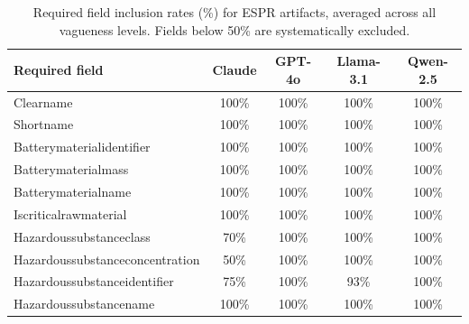 \begin{table}[t]
  \centering
  \caption{Required field inclusion rates (\%) for ESPR artifacts, averaged across all vagueness levels. Fields below 50\% are systematically excluded.}
  \label{tab:espr_field_inclusion}
  \begin{tabular}{lcccc}
    \toprule
    Required field & Claude & GPT-4o & Llama-3.1 & Qwen-2.5 \\
    \midrule
    Clearname & 100\% & 100\% & 100\% & 100\% \\
    Shortname & 100\% & 100\% & 100\% & 100\% \\
    Batterymaterialidentifier & 100\% & 100\% & 100\% & 100\% \\
    Batterymaterialmass & 100\% & 100\% & 100\% & 100\% \\
    Batterymaterialname & 100\% & 100\% & 100\% & 100\% \\
    Iscriticalrawmaterial & 100\% & 100\% & 100\% & 100\% \\
    Hazardoussubstanceclass & 70\% & 100\% & 100\% & 100\% \\
    Hazardoussubstanceconcentration & 50\% & 100\% & 100\% & 100\% \\
    Hazardoussubstanceidentifier & 75\% & 100\% & 93\% & 100\% \\
    Hazardoussubstancename & 100\% & 100\% & 100\% & 100\% \\
    \bottomrule
  \end{tabular}
\end{table}